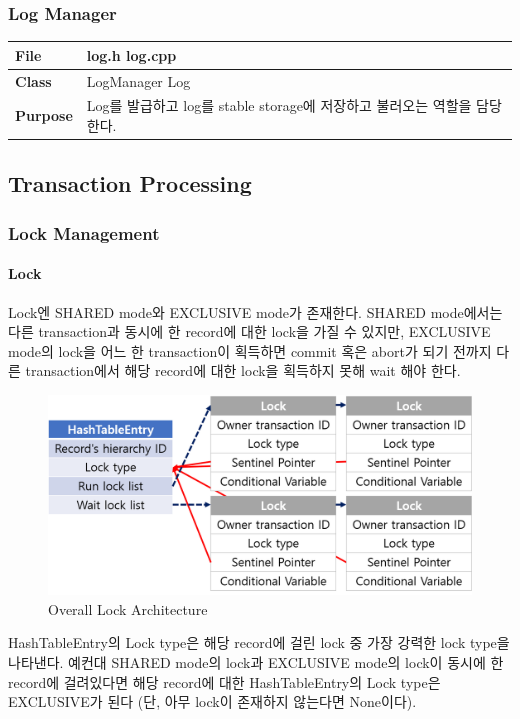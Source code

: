 \documentclass[main.tex]{subfiles}
\begin{document}
\subsubsection{Log Manager}
\begin{table}[!htb]
	\begin{tabularx}{\textwidth}{|l|X|}
		\hline
		\textbf{File} & log.h log.cpp \\
		\hline
		\textbf{Class} & LogManager Log \\
		\hline
		\textbf{Purpose} & Log를 발급하고 log를 stable storage에 저장하고 불러오는 역할을 담당한다. \\
		\hline
	\end{tabularx}
\end{table}

\subsection{Transaction Processing}

\subsubsection{Lock Management}
\paragraph{Lock}
Lock엔 SHARED mode와 EXCLUSIVE mode가 존재한다.
SHARED mode에서는 다른 transaction과 동시에 한 record에 대한 lock을 가질 수 있지만,
EXCLUSIVE mode의 lock을 어느 한 transaction이 획득하면 commit 혹은 abort가 되기 전까지 다른 transaction에서 해당 record에 대한 lock을 획득하지 못해 wait 해야 한다.

\begin{figure}[!hbt]
	\centering
	\includegraphics[width=.7\textwidth]{images/cc/lock_structure.png}
	\caption{Overall Lock Architecture}
\end{figure}

HashTableEntry의 Lock type은 해당 record에 걸린 lock 중 가장 강력한 lock type을 나타낸다.
예컨대 SHARED mode의 lock과 EXCLUSIVE mode의 lock이 동시에 한 record에 걸려있다면 해당 record에 대한 HashTableEntry의 Lock type은 EXCLUSIVE가 된다
(단, 아무 lock이 존재하지 않는다면 None이다).
\end{document}
